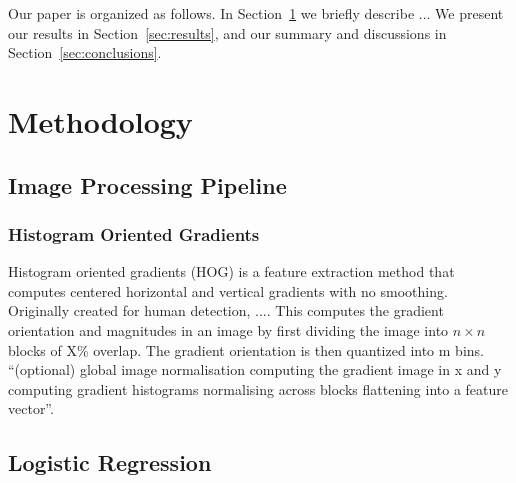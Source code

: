 \documentclass{emulateapj}
\begin{document}
Our paper is organized as follows.  In Section~\ref{sec:methods} we
briefly describe ...  We present our results in
Section~\ref{sec:results}, and our summary and discussions in
Section~\ref{sec:conclusions}.

\section{Methodology}
\label{sec:methods}

\subsection{Image Processing Pipeline}

\subsubsection{Histogram Oriented Gradients}
Histogram oriented gradients (HOG) is a feature extraction method that
computes centered horizontal and vertical gradients with no smoothing.
Originally created for human detection, .... This computes the
gradient orientation and magnitudes in an image by first dividing the
image into $n\times n$ blocks of X\% overlap.  The gradient
orientation is then quantized into m bins. ``(optional) global image
normalisation computing the gradient image in x and y computing
gradient histograms normalising across blocks flattening into a
feature vector''\citep{dalalandtriggs_05}.




\subsection{Logistic Regression}


\end{document}
